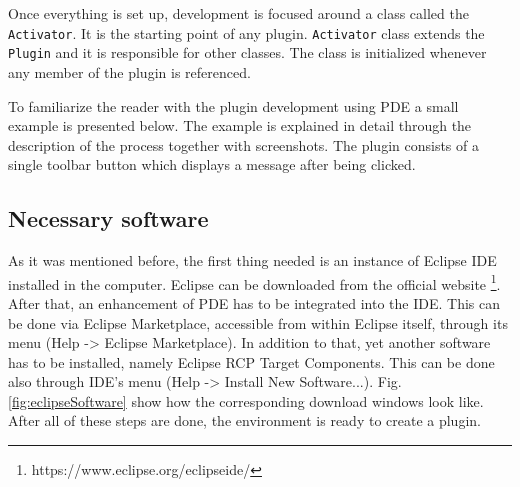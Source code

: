 Once everything is set up, development is focused around a class called the \texttt{Activator}. It is the starting point of any plugin. \texttt{Activator} class extends the \texttt{Plugin} and it is responsible for other classes. The class is initialized whenever any member of the plugin is referenced.

To familiarize the reader with the plugin development using PDE a small example is presented below. The example is explained in detail through the description of the process together with screenshots. The plugin consists of a single toolbar button which displays a message after being clicked. 

\subsection{Necessary software}

As it was mentioned before, the first thing needed is an instance of Eclipse IDE installed in the computer. Eclipse can be downloaded from the official website \footnote{https://www.eclipse.org/eclipseide/}. After that, an enhancement of PDE has to be integrated into the IDE. This can be done via Eclipse Marketplace, accessible from within Eclipse itself, through its menu (Help -> Eclipse Marketplace). In addition to that, yet another software has to be installed, namely Eclipse RCP Target Components. This can be done also through IDE's menu (Help -> Install New Software...). Fig. \ref{fig:eclipseSoftware} show how the corresponding download windows look like. After all of these steps are done, the environment is ready to create a plugin.

